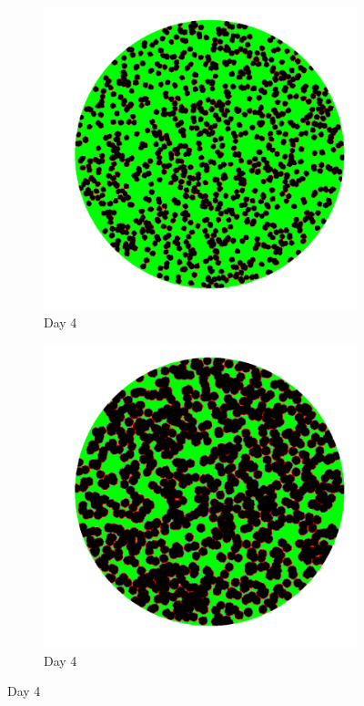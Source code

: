 \documentclass[a4paper]{article}
\begin{document}
\begin{center}
\begin{minipage}{0.65\linewidth}
\begin{figure}[H]
    \begin{subfigure}[b]{0.4\linewidth}
        \includegraphics[width=\linewidth]{cell_to_cell_photos/celltocell2.png}
        \caption{Day 4}
    \end{subfigure}
    \begin{subfigure}[b]{0.4\linewidth}
        \includegraphics[width=\linewidth]{cell_free_photos/cellfree2.png}
        \caption{Day 4}
    \end{subfigure}
    

\end{figure}
\end{minipage}
\end{center}
\end{document}
